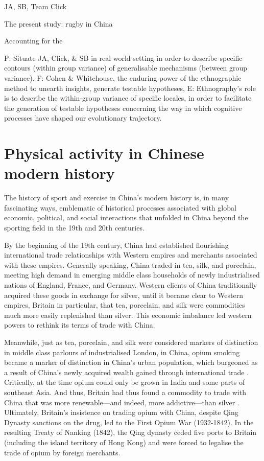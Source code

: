 JA, SB, Team Click

The present study: rugby in China



Accounting for the

    P: Situate JA, Click, & SB in real world setting in order to describe specific contours  (within group variance) of generalisable mechanisms (between group variance).
    F: Cohen & Whitehouse, the enduring power of the ethnographic method to unearth insights, generate testable hypotheses,
    E: Ethnography's role is to describe the within-group variance of specific locales, in order to facilitate the generation of testable hypotheses concerning the way in which cognitive processes have shaped our evolutionary trajectory.



\section{Physical activity in Chinese modern history}

  The history of sport and exercise in China's modern history is, in many fascinating ways, emblematic of historical processes associated with global economic, political, and social interactions that unfolded in China beyond the sporting field in the 19th and 20th centuries.





   By the beginning of the 19th century, China had established flourishing international trade relationships with Western empires and merchants associated with these empires.  Generally speaking, China traded in tea, silk, and porcelain, meeting high demand in emerging middle class households of newly industrialised nations of England, France, and Germany.  Western clients of China traditionally acquired these goods in exchange for silver, until it became clear to Western empires, Britain in particular, that tea, porcelain, and silk were commodities much more easily replenished than silver. This economic imbalance led western powers to rethink its terms of trade with China.

  Meanwhile, just as tea, porcelain, and silk were considered markers of distinction in middle class parlours of industrialised London, in China, opium smoking became a marker of distinction in China's urban population, which burgeoned as a result of China's newly acquired wealth gained through international trade \citep{Zheng2005}.  Critically, at the time opium could only be grown in India and some parts of southeast Asia. And thus, Britain had thus found a commodity to trade with China that was more renewable---and indeed, more addictive---than silver \citep{Fay2005}.  Ultimately, Britain's insistence on trading opium with China, despite Qing Dynasty sanctions on the drug, led to the First Opium War (1932-1842). In the resulting Treaty of Nanking (1842), the Qing dynasty ceded five ports to Britain (including the island territory of Hong Kong) and were forced to legalise the trade of opium by foreign merchants.

